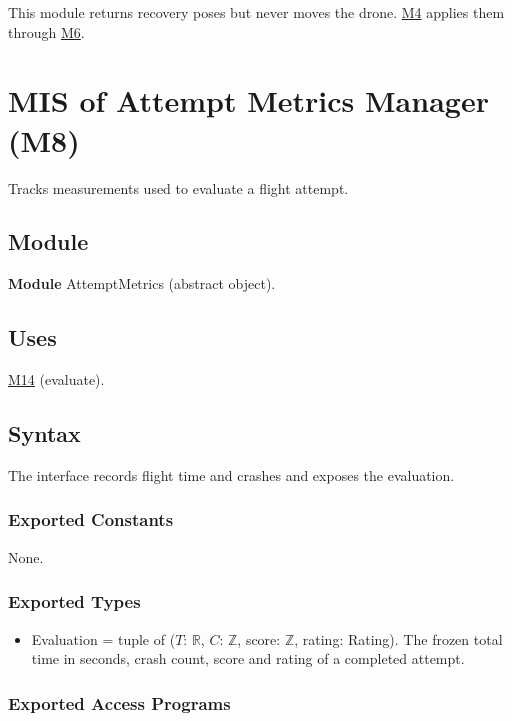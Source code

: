 \documentclass[12pt, titlepage]{article}
\newcommand{\Mref}[1]{\hyperref[sec:M#1]{M#1}}
\begin{document}
This module returns recovery poses but never moves the drone. \Mref{4} applies
them through \Mref{6}.

\newpage
\section{MIS of Attempt Metrics Manager (M8)} \label{sec:M8}

Tracks measurements used to evaluate a flight attempt.

\subsection{Module}

\textbf{Module} AttemptMetrics (abstract object).

\subsection{Uses}

\Mref{14} (evaluate).

\subsection{Syntax}

The interface records flight time and crashes and exposes the evaluation.

\subsubsection{Exported Constants}

None.

\subsubsection{Exported Types}

\begin{itemize}
\item Evaluation = tuple of ($T$: $\mathbb{R}$, $C$: $\mathbb{Z}$, score:
  $\mathbb{Z}$, rating: Rating). The frozen total time in seconds, crash count,
  score and rating of a completed attempt.
\end{itemize}

\subsubsection{Exported Access Programs}
\end{document}
